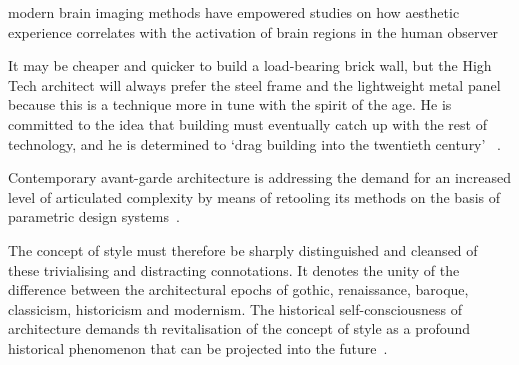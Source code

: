 


modern brain imaging methods have empowered studies on how aesthetic experience
correlates with the activation of brain regions in the human
observer



It may be cheaper and quicker to build a load-bearing brick wall, but
the High Tech architect will always prefer the steel frame and the lightweight metal panel because this is a technique more in tune with the spirit of the age.
He is committed to the idea that building must eventually catch up with the rest of technology, and he is determined to `drag building into the twentieth century' ~\cite{Davies1988}.

Contemporary avant-garde architecture is addressing the demand for an increased level of articulated complexity by means of retooling its methods on the basis of parametric design systems~\cite{Schumacher2008}.

The concept of style must therefore be sharply distinguished and cleansed of these trivialising and distracting connotations.
It denotes the unity of the difference between the architectural epochs of gothic, renaissance, baroque, classicism, historicism and modernism.
The historical self-consciousness of architecture demands th revitalisation of the concept of style as a profound historical phenomenon that can be projected into the future~\cite{Schumacher2010}.

